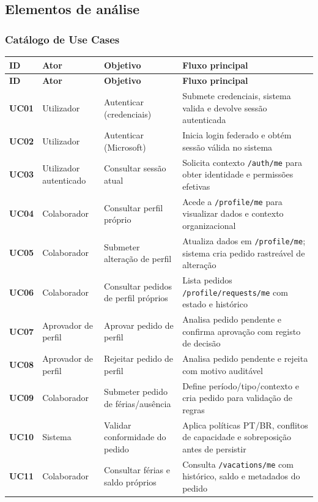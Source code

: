 \documentclass[11pt,a4paper,twoside]{article}
\newcommand{\tH}[1]{\textbf{\sffamily\small\color{white}#1}}
\newcommand{\theadrow}{\rowcolor{ACCENT}}
\begin{document}
\subsection{Elementos de análise}

\subsubsection{Catálogo de Use Cases}

\begin{longtable}{>{\small\centering\arraybackslash\bfseries}p{0.8cm} >{\small}p{2.4cm} >{\small}p{3.7cm} >{\small}p{6.9cm}}
\theadrow
\tH{ID} & \tH{Ator} & \tH{Objetivo} & \tH{Fluxo principal} \\
\midrule
\endfirsthead
\theadrow
\tH{ID} & \tH{Ator} & \tH{Objetivo} & \tH{Fluxo principal} \\
\midrule
\endhead
UC01 & Utilizador & Autenticar (credenciais) & Submete credenciais, sistema valida e devolve sessão autenticada \\
UC02 & Utilizador & Autenticar (Microsoft) & Inicia login federado e obtém sessão válida no sistema \\
UC03 & Utilizador autenticado & Consultar sessão atual & Solicita contexto \texttt{/auth/me} para obter identidade e permissões efetivas \\
UC04 & Colaborador & Consultar perfil próprio & Acede a \texttt{/profile/me} para visualizar dados e contexto organizacional \\
UC05 & Colaborador & Submeter alteração de perfil & Atualiza dados em \texttt{/profile/me}; sistema cria pedido rastreável de alteração \\
UC06 & Colaborador & Consultar pedidos de perfil próprios & Lista pedidos \texttt{/profile/requests/me} com estado e histórico \\
UC07 & Aprovador de perfil & Aprovar pedido de perfil & Analisa pedido pendente e confirma aprovação com registo de decisão \\
UC08 & Aprovador de perfil & Rejeitar pedido de perfil & Analisa pedido pendente e rejeita com motivo auditável \\
UC09 & Colaborador & Submeter pedido de férias/ausência & Define período/tipo/contexto e cria pedido para validação de regras \\
UC10 & Sistema & Validar conformidade do pedido & Aplica políticas PT/BR, conflitos de capacidade e sobreposição antes de persistir \\
UC11 & Colaborador & Consultar férias e saldo próprios & Consulta \texttt{/vacations/me} com histórico, saldo e metadados do pedido \\

\end{longtable}
\end{document}
